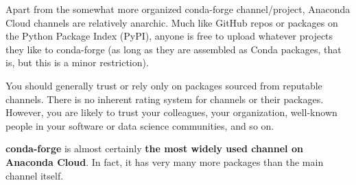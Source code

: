\documentclass[11pt]{article}
\begin{document}
Apart from the somewhat more organized conda-forge channel/project,
Anaconda Cloud channels are relatively anarchic. Much like GitHub repos
or packages on the Python Package Index (PyPI), anyone is free to upload
whatever projects they like to conda-forge (as long as they are
assembled as Conda packages, that is, but this is a minor restriction).

You should generally trust or rely only on packages sourced from
reputable channels. There is no inherent rating system for channels or
their packages. However, you are likely to trust your colleagues, your
organization, well-known people in your software or data science
communities, and so on.

\textbf{conda-forge} is almost certainly \textbf{the most widely used
channel on Anaconda Cloud}. In fact, it has very many more packages than
the main channel itself.


    
    
    
    
\end{document}
